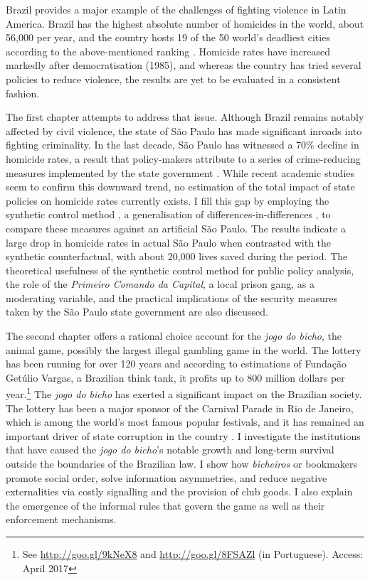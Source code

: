 Brazil provides a major example of the challenges of fighting violence in Latin America. Brazil has the highest absolute number of homicides in the world, about 56,000 per year, and the country hosts 19 of the 50 world's deadliest cities according to the above-mentioned ranking \citep{mapa2014, mexico2014,unodc2013}. Homicide rates have increased markedly after democratisation (1985), and whereas the country has tried several policies to reduce violence, the results are yet to be evaluated in a consistent fashion. 

The first chapter attempts to address that issue. Although Brazil remains notably affected by civil violence, the state of São Paulo has made significant inroads into fighting criminality. In the last decade, São Paulo has witnessed a 70\% decline in homicide rates, a result that policy-makers attribute to a series of crime-reducing measures implemented by the state government \citep{goertzel2009,kahn2005papel}. While recent academic studies seem to confirm this downward trend, no estimation of the total impact of state policies on homicide rates currently exists. I fill this gap by employing the synthetic control method \citep{abadie2003,abadie2010,abadie2014}, a generalisation of differences-in-differences \citep{angrist2008mostly,bertrand2004much,imbens2009recent}, to compare these measures against an artificial São Paulo. The results indicate a large drop in homicide rates in actual São Paulo when contrasted with the synthetic counterfactual, with about 20,000 lives saved during the period. The theoretical usefulness of the synthetic control method for public policy analysis, the role of the \textit{Primeiro Comando da Capital}, a local prison gang, as a moderating variable, and the practical implications of the security measures taken by the São Paulo state government are also discussed.

The second chapter offers a rational choice account for the \textit{jogo do bicho}, the animal game, possibly the largest illegal gambling game in the world. The lottery has been running for over 120 years and according to estimations of Fundação Getúlio Vargas, a Brazilian think tank, it profits up to 800 million dollars per year.\footnote{See \url{http://goo.gl/9kNeX8} and \url{http://goo.gl/8FSAZl} (in Portuguese). Access: April 2017} The \emph{jogo do bicho} has exerted a significant impact on the Brazilian society. The lottery has been a major sponsor of the Carnival Parade in Rio de Janeiro, which is among the world's most famous popular festivals, and it has remained an important driver of state corruption in the country \citep{bezerra2009mecenato,chazkel2011laws,da1999aguias,labronici2012paratodos,magalhaes2005ganhou,soares1993jogo}. I investigate the institutions that have caused the \emph{jogo do bicho}'s notable growth and long-term survival outside the boundaries of the Brazilian law. I show how \textit{bicheiros} or bookmakers promote social order, solve information asymmetries, and reduce negative externalities via costly signalling and the provision of club goods. I also explain the emergence of the informal rules that govern the game as well as their enforcement mechanisms.

